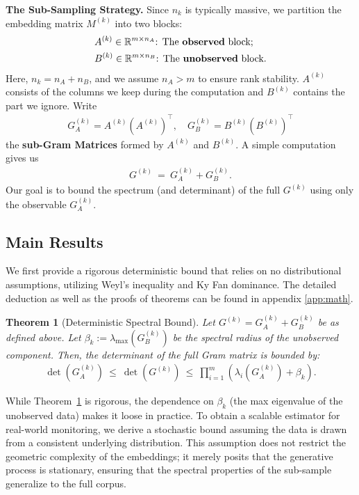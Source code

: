 \documentclass{article}
\theoremstyle{plain}
\newtheorem{theorem}{Theorem}
\theoremstyle{definition}
\theoremstyle{remark}
\begin{document}
\textbf{The Sub-Sampling Strategy.}
Since $n_k$ is typically massive, we partition the embedding matrix $M^{(k)}$ into two blocks:
\begin{align}
    &A^{(k)} \in \mathbb{R}^{m \times n_A} \text{: The \textbf{observed} block;} \nonumber \\
    &B^{(k)} \in \mathbb{R}^{m \times n_B} \text{: The \textbf{unobserved} block.} \nonumber
\end{align}
Here, $n_k = n_A + n_B$, and we assume $n_A > m$ to ensure rank stability. $A^{(k)}$ consists of the columns we keep during the computation and $B^{(k)}$ contains the part we ignore. Write
\begin{align}
    G_A^{(k)} = A^{(k)}(A^{(k)})^\top, \quad G_B^{(k)} = B^{(k)}(B^{(k)})^\top
\end{align}
the \textbf{sub-Gram Matrices} formed by $A^{(k)}$ and $B^{(k)}$. A simple computation gives us
\begin{align}
    G^{(k)} \ = \ G_A^{(k)} + G_B^{(k)}.
\end{align}
Our goal is to bound the spectrum (and determinant) of the full $G^{(k)}$ using only the observable $G_A^{(k)}$.

\subsection{Main Results} \label{sec:theorems}

We first provide a rigorous deterministic bound that relies on no distributional assumptions, utilizing Weyl's inequality and Ky Fan dominance. The detailed deduction as well as the proofs of theorems can be found in appendix \ref{app:math}.

\begin{theorem}[Deterministic Spectral Bound]
\label{thm:deterministic}
Let $G^{(k)} = G_A^{(k)} + G_B^{(k)}$ be as defined above. Let $\beta_k := \lambda_{\max}(G_B^{(k)})$ be the spectral radius of the unobserved component. Then, the determinant of the full Gram matrix is bounded by:
\begin{align}
    \det(G_A^{(k)}) \ \leq \ \det(G^{(k)}) \ \leq \ \prod_{i=1}^m \left(\lambda_i(G_A^{(k)}) + \beta_k\right).
\end{align}
\end{theorem}
While Theorem~\ref{thm:deterministic} is rigorous, the dependence on $\beta_k$ (the max eigenvalue of the unobserved data) makes it loose in practice. To obtain a scalable estimator for real-world monitoring, we derive a stochastic bound assuming the data is drawn from a consistent underlying distribution. This assumption does not restrict the geometric complexity of the embeddings; it merely posits that the generative process is stationary, ensuring that the spectral properties of the sub-sample generalize to the full corpus.
\end{document}
